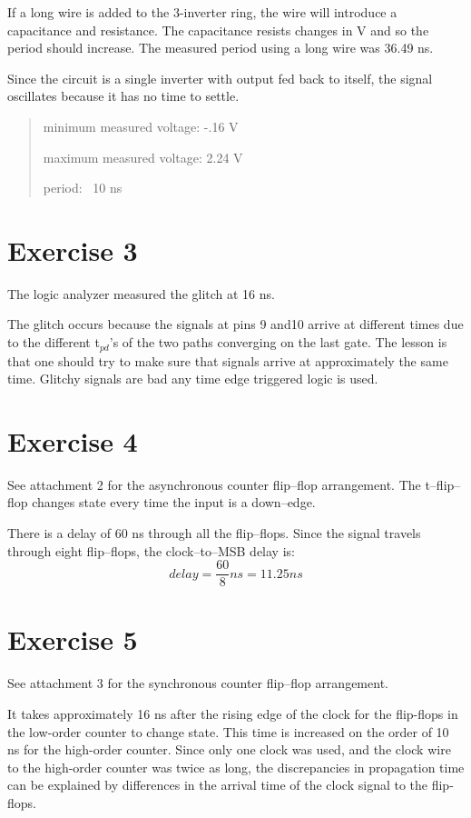 \documentclass{article}
\begin{document}
If a long wire is added to the 3-inverter ring, the wire will introduce a
capacitance and resistance.  The capacitance resists changes in V and so the
period should increase.  The measured period using a long wire was 36.49 ns.

Since the circuit is a single inverter with output fed back to itself, the signal oscillates because it has no time to settle.
\begin{quote}
minimum measured voltage: -.16 V

maximum measured voltage: 2.24 V

period: ~10 ns
\end{quote}

\section{Exercise 3}
The logic analyzer measured the glitch at 16 ns.

The glitch occurs because the signals at pins 9 and10 arrive at different times
due to the different t$_{pd}$'s of the two paths converging on the last gate.
The lesson is that one should try to make sure that signals arrive at
approximately the same time.  Glitchy signals are bad any time edge triggered
logic is used.


\section{Exercise 4}
See attachment 2 for the asynchronous counter flip--flop arrangement.  The
t--flip--flop changes state every time the input is a down--edge.

There is a delay of 60 ns through all the flip--flops.  Since the signal
travels through eight flip--flops, the clock--to--MSB delay is:
\[
delay = \frac{60}{8} ns = 11.25 ns
\]

\section{Exercise 5}
See attachment 3 for the synchronous counter flip--flop arrangement.

It takes approximately 16 ns after the rising edge of the clock for the
flip-flops in the low-order counter to change state.  This time is increased on
the order of 10 ns for the high-order counter.  Since only one clock was used,
and the clock wire to the high-order counter was twice as long, the
discrepancies in propagation time can be explained by differences in the arrival
time of the clock signal to the flip-flops.
\end{document}

